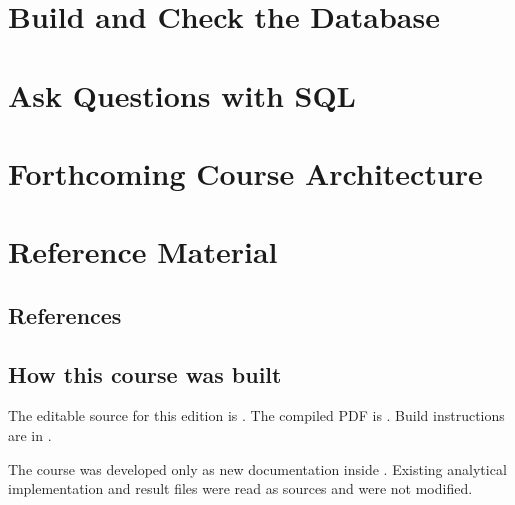 \documentclass[11pt,openany]{book}
\begin{document}
\part{Build and Check the Database}




\part{Ask Questions with SQL}



\part{Forthcoming Course Architecture}


\appendix
\part{Reference Material}



\chapter{References}
\label{ch:references}



\backmatter
\chapter*{How this course was built}
The editable source for this edition is
. The compiled PDF is
. Build
instructions are in .

The course was developed only as new documentation inside
. Existing analytical implementation and result files
were read as sources and were not modified.
\end{document}
